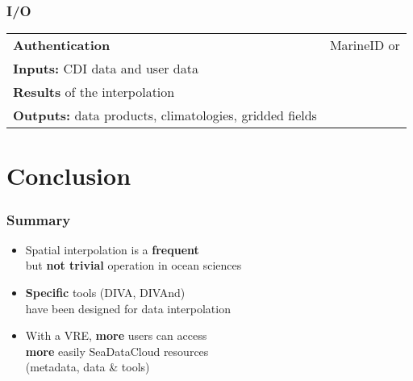 %
%

\begin{frame}
\frametitle{I/O}
\begin{tabular}{R{7cm}C{3cm}}
\textbf{Authentication} & MarineID or \\
\textbf{Inputs:} CDI data and user data & \\
\textbf{Results} of the interpolation  & \\
\textbf{Outputs:} data products, climatologies, gridded fields & 
\end{tabular}
\end{frame}
\section{Conclusion}

\begin{frame}
\frametitle{Summary}
\begin{itemize}
\item<1->[\Checkmark] Spatial interpolation is a \textbf{frequent}\\ but \textbf{not trivial} operation in ocean sciences
\item<2->[\Checkmark] \textbf{Specific} tools (DIVA, DIVAnd)\\ have been designed for data interpolation
\item<3->[\Checkmark] With a VRE, \textbf{more} users can access\\ \textbf{more} easily SeaDataCloud resources\\ (metadata, data \& tools)
\end{itemize}
\end{frame}

